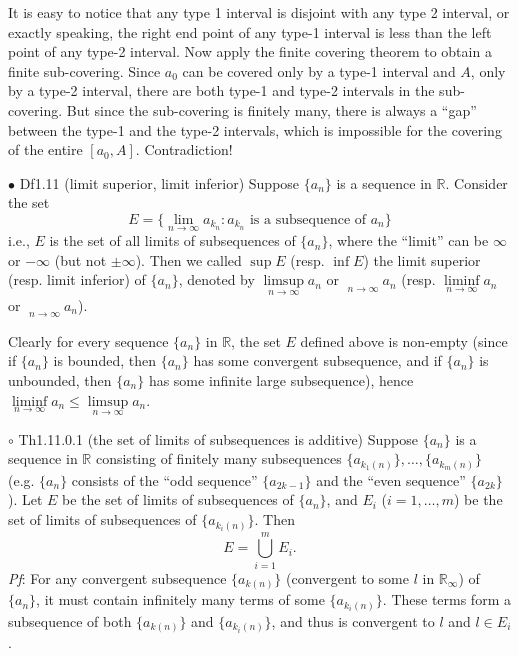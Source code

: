 \documentclass{article}
\begin{document}
\begin{Rmk}{}
\begin{compactenum}
    \end{compactenum}
    It is easy to notice that any type 1 interval is disjoint with any type 2 interval, or exactly speaking, the right end point of any type-1 interval is less than the left point of any type-2 interval. Now apply the finite covering theorem to obtain a finite sub-covering. Since $a_0$ can be covered only by a type-1 interval and $A$, only by a type-2 interval, there are both type-1 and type-2 intervals in the sub-covering. But since the sub-covering is finitely many, there is always a ``gap'' between the type-1 and the type-2 intervals, which is impossible for the covering of the entire $[a_0, A]$. Contradiction!
\end{Rmk}

\begin{Df}{$\bullet$ Df1.11 (limit superior, limit inferior)}
    Suppose $\{a_n\}$ is a sequence in $\mathbb{R}$. Consider the set
    $$ E = \{\lim\limits_{n\to\infty} a_{k_n}: a_{k_n} \text{ is a subsequence of } a_n\} $$
    i.e., $E$ is the set of all limits of subsequences of $\{a_n\}$, where the ``limit'' can be $\infty$ or $-\infty$ (but not $\pm\infty$). Then we called $\sup E$ (resp. $\inf E$) the limit superior (resp. limit inferior) of $\{a_n\}$, denoted by $\limsup\limits_{n\to\infty}a_n$ or $\mathop{\overline{\lim}}\limits_{n\to\infty} a_n$ (resp. $\liminf\limits_{n\to\infty}a_n$ or $\mathop{\underline{\lim}}\limits_{n\to\infty} a_n$).
\end{Df}

\begin{Rmk}{}
    \textcolor{Th}{Clearly for every sequence $\{a_n\}$ in $\mathbb{R}$, the set $E$ defined above is non-empty} (since if $\{a_n\}$ is bounded, then $\{a_n\}$ has some convergent subsequence, and if $\{a_n\}$ is unbounded, then $\{a_n\}$ has some infinite large subsequence), \textcolor{Th}{hence $\liminf\limits_{n\to\infty}a_n\leq \limsup\limits_{n\to\infty}a_n$.}
\end{Rmk}

\begin{Th}{$\circ$ Th1.11.0.1 (the set of limits of subsequences is additive)}
    Suppose $\{a_n\}$ is a sequence in $\mathbb{R}$ consisting of finitely many subsequences $\{a_{k_1(n)}\}, \dots, \{a_{k_m(n)}\}$ (e.g. $\{a_n\}$ consists of the ``odd sequence'' $\{a_{2k-1}\}$ and the ``even sequence'' $\{a_{2k}\}$). Let $E$ be the set of limits of subsequences of $\{a_n\}$, and $E_i$ ($i=1, \dots, m$) be the set of limits of subsequences of $\{a_{k_i(n)}\}$. Then
    $$ E = \bigcup\limits_{i=1}^m E_i. $$
    \tcblower
    \textit{Pf}: For any convergent subsequence $\{a_{k(n)}\}$ (convergent to some $l$ in $\mathbb{R}_\infty$) of $\{a_n\}$, it must contain infinitely many terms of some $\{a_{k_i(n)}\}$. These terms form a subsequence of both $\{a_{k(n)}\}$ and $\{a_{k_i(n)}\}$, and thus is convergent to $l$ and $l\in E_i$. 
\end{Th}
\end{document}
